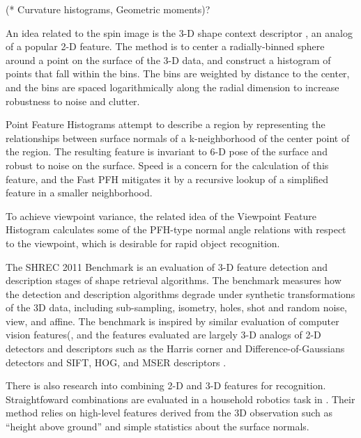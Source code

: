 (* Curvature histograms, Geometric moments)?

An idea related to the spin image is the 3-D shape context descriptor \cite{Frome2004}, an analog of a popular 2-D feature.
The method is to center a radially-binned sphere around a point on the surface of the 3-D data, and construct a histogram of points that fall within the bins.
The bins are weighted by distance to the center, and the bins are spaced logarithmically along the radial dimension to increase robustness to noise and clutter.

Point Feature Histograms \cite{pfh1} attempt to describe a region by representing the relationships between surface normals of a k-neighborhood of the center point of the region.
The resulting feature is invariant to 6-D pose of the surface and robust to noise on the surface.
Speed is a concern for the calculation of this feature, and the Fast PFH mitigates it by a recursive lookup of a simplified feature in a smaller neighborhood.

To achieve viewpoint variance, the related idea of the Viewpoint Feature Histogram \cite{Rusu2010} calculates some of the PFH-type normal angle relations with respect to the viewpoint, which is desirable for rapid object recognition.



The SHREC 2011 Benchmark \cite{Boyer2011} is an evaluation of 3-D feature detection and description stages of shape retrieval algorithms.
The benchmark measures how the detection and description algorithms degrade under synthetic transformations of the 3D data, including sub-sampling, isometry, holes, shot and random noise, view, and affine.
The benchmark is inspired by similar evaluation of computer vision features(\cite{Mikolajczyk2004,Mikolajczyk2005}, and the features evaluated are largely 3-D analogs of 2-D detectors and descriptors such as the Harris corner and Difference-of-Gaussians \cite{Harris1988,Lowe2004} detectors and SIFT, HOG, and MSER descriptors \cite{Lowe2004,Dalal2005,Matas2004}.


There is also research into combining 2-D and 3-D features for recognition.
Straightfoward combinations are evaluated in a household robotics task in \cite{Gould2008}.
Their method relies on high-level features derived from the 3D observation such as ``height above ground'' and simple statistics about the surface normals.

